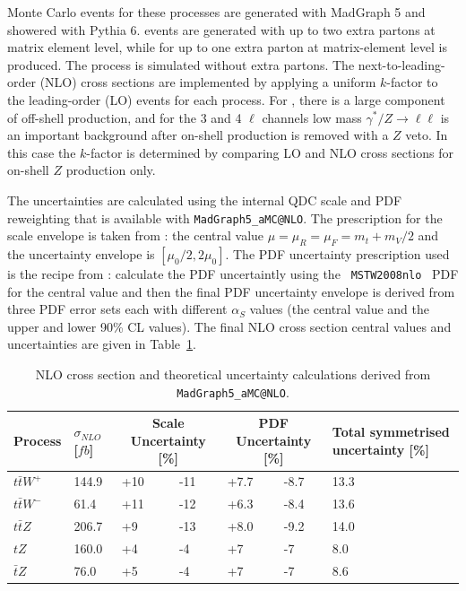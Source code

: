 Monte Carlo events for these processes are generated with MadGraph 5 and showered with Pythia 6.  \ttW events are generated with up to two extra partons at matrix element level, while for \ttZ up to one extra parton at matrix-element level is produced.  The \tZ process is simulated without extra partons.  The next-to-leading-order (NLO) cross sections are implemented by applying a uniform $k$-factor to the leading-order (LO) events for each process.  For \ttZ, there is a large component of off-shell production, and for the 3 and 4 $\ell$ channels low mass $\gamma^*/Z \to \ell\ell$ is an important background after on-shell production is removed with a $Z$ veto.  In this case the $k$-factor is determined by comparing LO and NLO cross sections for on-shell $Z$ production only.   

The \ttV uncertainties are calculated
using the internal QDC scale and PDF reweighting that is available with
{\tt MadGraph5\_aMC@NLO}. The prescription for the scale envelope is taken from
\cite{Garzelli:2012bn}: the central value $\mu=\mu_{R}=\mu_{F}=m_t+m_V/2$
and the uncertainty envelope is $[\mu_{0}/2,2\mu_{0}]$. The PDF
uncertainty prescription used is the recipe from
\cite{Campbell:2012dh}: calculate the PDF uncertaintly using the {\tt
MSTW2008nlo}~\cite{Martin:2009iq} PDF for the central value and then the final PDF
uncertainty envelope is derived from three PDF error sets each with
different $\alpha_S$ values (the central value and the upper and lower
90\% CL values). The final NLO cross section central values and
uncertainties are given in Table~\ref{tab:ttVXSunc}.

\begin{table}%
\begin{center}
\begin{tabular}{l|p{}|p{}|p{}|p{}|p{}|p{}}
\hline
Process & $\sigma_{NLO}$ [$fb$] & \multicolumn{2}{c|}{Scale
Uncertainty [\%]} & \multicolumn{2}{c|}{PDF Uncertainty [\%]} & Total
symmetrised uncertainty [\%] \\
\hline
\hline
$t\bar{t}W^{+}$ & 144.9 & +10 & -11 & +7.7 & -8.7 & 13.3 \\
$t\bar{t}W^{-}$ & 61.4  & +11 & -12 & +6.3 & -8.4 & 13.6 \\
$t\bar{t}Z$     & 206.7 & +9  & -13 & +8.0 & -9.2 & 14.0 \\
$tZ$            & 160.0 & +4  & -4  & +7   & -7   & 8.0 \\
$\bar{t}Z$      & 76.0  & +5  & -4  & +7   & -7   & 8.6 \\
\hline
\end{tabular}
\caption{NLO cross section and theoretical uncertainty
  calculations derived from {\tt MadGraph5\_aMC@NLO}.}
\label{tab:ttVXSunc}
\end{center}
\end{table}


